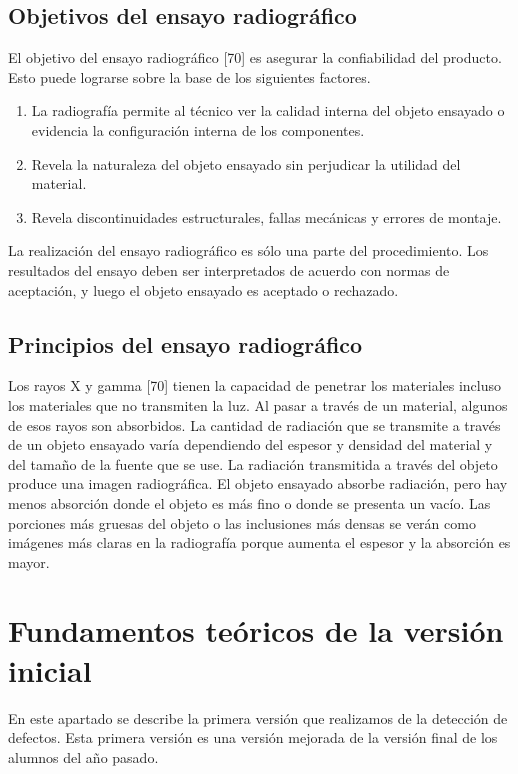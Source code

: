 \subsection{Objetivos del ensayo radiográfico}
El objetivo del ensayo radiográfico [70] es asegurar la confiabilidad del producto. Esto puede lograrse sobre la base de los siguientes factores.

\begin{enumerate}
\item La radiografía permite al técnico ver la calidad interna del objeto ensayado o evidencia la
configuración interna de los componentes.
\item Revela la naturaleza del objeto ensayado sin perjudicar la utilidad del material.
\item Revela discontinuidades estructurales, fallas mecánicas y errores de montaje.
\end{enumerate}

La realización del ensayo radiográfico es sólo una parte del procedimiento. Los resultados del ensayo deben ser interpretados de acuerdo con normas de aceptación, y luego el objeto ensayado es aceptado o rechazado.

\subsection{Principios del ensayo radiográfico}
Los rayos X y gamma [70] tienen la capacidad de penetrar los materiales incluso los materiales que no transmiten la luz. Al pasar a través de un material, algunos de esos rayos son absorbidos. La cantidad de radiación que se transmite a través de un objeto ensayado varía dependiendo del espesor y densidad del material y del tamaño de la fuente que se use. La radiación transmitida a través del objeto produce una imagen radiográfica. El objeto ensayado absorbe radiación, pero hay menos absorción donde el objeto es más fino o donde se presenta un vacío. Las porciones más gruesas del objeto o las inclusiones más densas se verán como imágenes más claras en la radiografía porque aumenta el espesor y la absorción es mayor.


\section{Fundamentos teóricos de la versión inicial}
En este apartado se describe la primera versión que realizamos de la detección de defectos. Esta primera versión es una versión mejorada de la versión final de los alumnos del año pasado.

